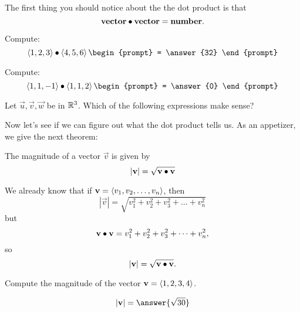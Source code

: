 \documentclass{ximera}
\begin{document}
The first thing you should notice about the the dot product is that
\[
\mathbf{vector}\bullet \mathbf{vector} = \mathbf{number}.
\]
\begin{question}
  Compute:
  \[
  \vector{1,2,3}\dotp\vector{4,5,6}
  \begin{prompt}
    = \answer{32}
  \end{prompt}
  \]
  \begin{question}
  Compute:
  \[
  \vector{1,1,-1}\dotp\vector{1,1,2}
  \begin{prompt}
    = \answer{0}
  \end{prompt}
  \]
\end{question}
\end{question}

\begin{question}
  Let $\vec{u},\vec{v},\vec{w}$ be in $\mathbb R^3$. Which of the following
  expressions make sense?
  \begin{selectAll}
  \end{selectAll}
\end{question}

Now let's see if we can figure out what the dot product tells us. As
an appetizer, we give the next theorem:

\begin{theorem}
  The magnitude of a vector $\vec{v}$ is given by
  \[
  |\mathbf{v}|=\sqrt{\mathbf{v}\bullet\mathbf{v}}
  \]
  \begin{explanation}
    We already know that if $\mathbf{v} = \left\langle v_1,v_2,\dots,v_n\right\rangle$,
    then
    \[
    |\vec{v}| = \sqrt{v_1^2+v_2^2+v_3^2+\dots+v_n^2}
    \]
    but
    \[
    \mathbf{v} \bullet \mathbf{v} = v_1^2+v_2^2+v_3^2+\dots+v_n^2,
    \]
    so
    \[
    |\mathbf{v}|=\sqrt{\mathbf{v}\bullet\mathbf{v}}.
    \]
  \end{explanation}
\end{theorem}

\begin{question}
  Compute the magnitude of the vector $\mathbf{v} = \left\langle 1,2,3,4\right\rangle$.
  \begin{prompt}
    \[
    |\vec{v}| = \answer{\sqrt{30}}
    \]
  \end{prompt}
\end{question}
\end{document}
